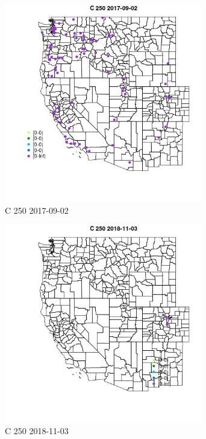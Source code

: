 \begin{figure} 
\centering  
\includegraphics[width=0.77\textwidth]{Code_Outputs/Report_ML_input_PM25_Step4_part_e_de_duplicated_aveswNAs_MapObsC_2502017-09-02.jpg} 
\caption{\label{fig:Report_ML_input_PM25_Step4_part_e_de_duplicated_aveswNAsMapObsC_2502017-09-02}C 250 2017-09-02} 
\end{figure} 
 

\begin{figure} 
\centering  
\includegraphics[width=0.77\textwidth]{Code_Outputs/Report_ML_input_PM25_Step4_part_e_de_duplicated_aveswNAs_MapObsC_2502018-11-03.jpg} 
\caption{\label{fig:Report_ML_input_PM25_Step4_part_e_de_duplicated_aveswNAsMapObsC_2502018-11-03}C 250 2018-11-03} 
\end{figure} 
 

